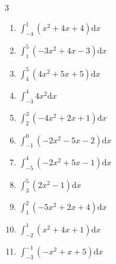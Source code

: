 \begin{multicols}{3}
\begin{enumerate}
  \item $\displaystyle \int_{-4}^{1}\left( x^{2}+4x+4 \right) \mathrm{d}x$

        \phantom{$\displaystyle =-5$}

  \item $\displaystyle \int_{1}^{5}\left( -3x^{2}+4x-3 \right) \mathrm{d}x$

        \phantom{$\displaystyle =-78$}

  \item $\displaystyle \int_{4}^{5}\left( 4x^{2}+5x+5 \right) \mathrm{d}x$


  \item $\displaystyle \int_{-3}^{4}4x^{2} \mathrm{d}x$


\columnbreak %

\resetques

  \item $\displaystyle \int_{2}^{3}\left( -4x^{2}+2x+1 \right) \mathrm{d}x$


  \item $\displaystyle \int_{-1}^{0}\left( -2x^{2}-5x-2 \right) \mathrm{d}x$


  \item $\displaystyle \int_{-5}^{4}\left( -2x^{2}+5x-1 \right) \mathrm{d}x$

        \phantom{$\displaystyle =-150$}

  \item $\displaystyle \int_{3}^{5}\left( 2x^{2}-1 \right) \mathrm{d}x$

        \phantom{$\displaystyle =65$}

  \item $\displaystyle \int_{1}^{2}\left( -5x^{2}+2x+4 \right) \mathrm{d}x$

        \phantom{$\displaystyle =-8$}

\columnbreak %

  \item $\displaystyle \int_{-2}^{1}\left( x^{2}+4x+1 \right) \mathrm{d}x$


  \item $\displaystyle \int_{-3}^{-1}\left( -x^{2}+x+5 \right) \mathrm{d}x$


\end{enumerate}
\end{multicols}
